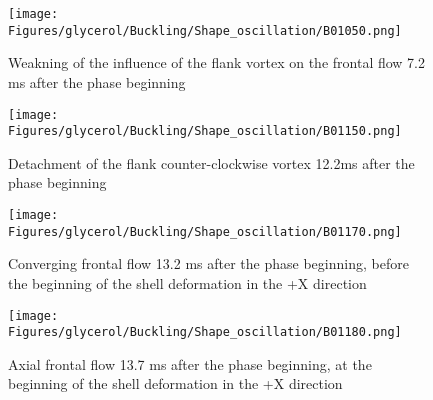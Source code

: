 \documentclass[a4paper,10pt]{report}
\begin{document}
\begin{figure}[htbp]%
	\centering%
		\texttt{[image: Figures/glycerol/Buckling/Shape\_oscillation/B01050.png]}%
		\caption{Weakning of the influence of the flank vortex on the frontal flow 7.2 ms after the phase beginning}%
		\label{fig:weakning}%
\end{figure}

\begin{figure}[htbp]%
	\centering%
		\texttt{[image: Figures/glycerol/Buckling/Shape\_oscillation/B01150.png]}%
		\caption{Detachment of the flank counter-clockwise vortex 12.2ms after the phase beginning}%
		\label{fig:detachingccwvortex}%
\end{figure}
\begin{figure}[htbp]%
	\centering%
		\texttt{[image: Figures/glycerol/Buckling/Shape\_oscillation/B01170.png]}%
		\caption{Converging frontal flow 13.2 ms after the phase beginning, before the beginning of the shell deformation in the +X direction}%
		\label{fig:convergingflow}%
\end{figure}
\begin{figure}[htbp]%
	\centering%
		\texttt{[image: Figures/glycerol/Buckling/Shape\_oscillation/B01180.png]}%
		\caption{Axial frontal flow 13.7 ms after the phase beginning, at the beginning of the shell deformation in the +X direction}%
		\label{fig:convergingaxialflow}%
\end{figure}
\end{document}
